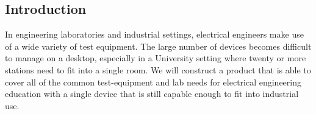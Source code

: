 \subsection{Introduction}
In engineering laboratories and industrial settings, electrical engineers make use of a wide variety of test equipment. The large number of devices becomes difficult to manage on a desktop, especially in a University setting where twenty or more stations need to fit into a single room. We will construct a product that is able to cover all of the common test-equipment and lab needs for electrical engineering education with a single device that is still capable enough to fit into industrial use.
